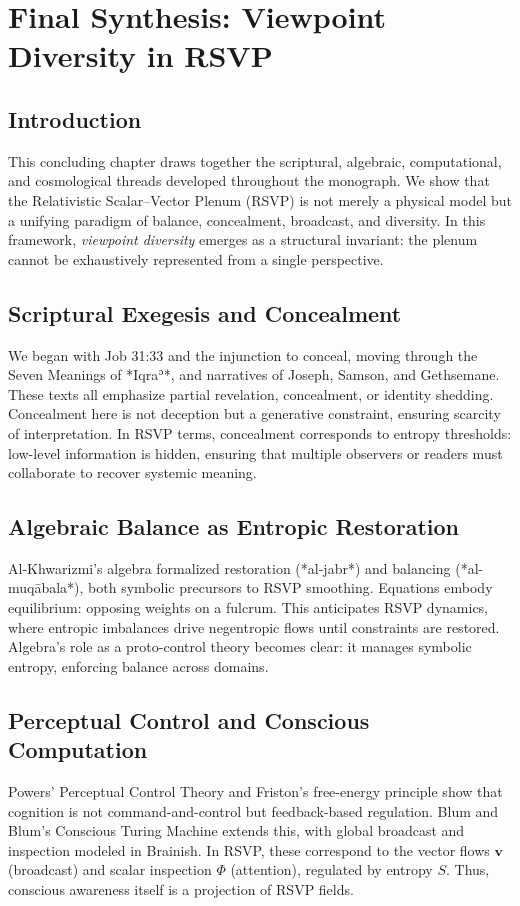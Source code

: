\documentclass[a4paper,11pt,openany]{book}
\begin{document}
\chapter{Final Synthesis: Viewpoint Diversity in RSVP}

\section{Introduction}
This concluding chapter draws together the scriptural, algebraic, computational, and cosmological 
threads developed throughout the monograph. We show that the Relativistic Scalar–Vector Plenum (RSVP) 
is not merely a physical model but a unifying paradigm of balance, concealment, broadcast, and diversity. 
In this framework, \emph{viewpoint diversity} emerges as a structural invariant: the plenum cannot be 
exhaustively represented from a single perspective.  

\section{Scriptural Exegesis and Concealment}
We began with Job 31:33 and the injunction to conceal, moving through the Seven Meanings of *Iqraʾ*, 
and narratives of Joseph, Samson, and Gethsemane. These texts all emphasize partial revelation, 
concealment, or identity shedding. Concealment here is not deception but a generative constraint, 
ensuring scarcity of interpretation. In RSVP terms, concealment corresponds to entropy thresholds: 
low-level information is hidden, ensuring that multiple observers or readers must collaborate to 
recover systemic meaning.

\section{Algebraic Balance as Entropic Restoration}
Al-Khwarizmi’s algebra formalized restoration (*al-jabr*) and balancing (*al-muqābala*), both 
symbolic precursors to RSVP smoothing. Equations embody equilibrium: opposing weights on 
a fulcrum. This anticipates RSVP dynamics, where entropic imbalances drive negentropic flows until 
constraints are restored. Algebra’s role as a proto-control theory becomes clear: it manages symbolic 
entropy, enforcing balance across domains.

\section{Perceptual Control and Conscious Computation}
Powers’ Perceptual Control Theory and Friston’s free-energy principle show that cognition is not 
command-and-control but feedback-based regulation. Blum and Blum’s Conscious Turing Machine 
extends this, with global broadcast and inspection modeled in Brainish. In RSVP, these correspond 
to the vector flows $\mathbf{v}$ (broadcast) and scalar inspection $\Phi$ (attention), regulated by 
entropy $S$. Thus, conscious awareness itself is a projection of RSVP fields.
\end{document}
